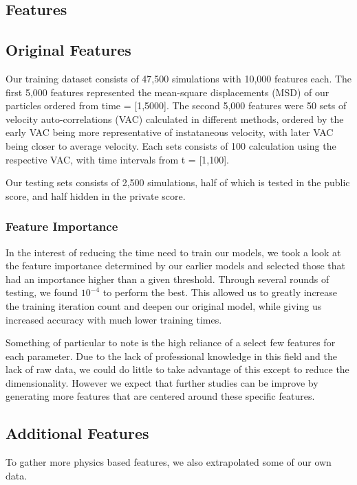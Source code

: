 \documentclass[a4paper, 12pt]{article}
\begin{document}
        \begin{multicols}{2}
        \section{Features}
        \subsection{Original Features}
        Our training dataset consists of 47,500 simulations with 10,000 features each. The first 5,000 features represented the mean-square displacements (MSD) of our particles ordered from time = [1,5000]. The second 5,000 features were 50 sets of velocity auto-correlations (VAC) calculated in different methods, ordered by the early VAC being more representative of instataneous velocity, with later VAC being closer to average velocity. Each sets consists of 100 calculation using the respective VAC, with time intervals from t = [1,100].
        
        Our testing sets consists of 2,500 simulations, half of which is tested in the public score, and half hidden in the private score.

            \subsubsection{Feature Importance}
                In the interest of reducing the time need to train our models, we took a look at the feature importance determined by our earlier models and selected those that had an importance higher than a given threshold. Through several rounds of testing, we found $10^{-4}$ to perform the best. This allowed us to greatly increase the training iteration count and deepen our original model, while giving us increased accuracy with much lower training times.
                
                Something of particular to note is the high reliance of a select few features for each parameter. Due to the lack of professional knowledge in this field and the lack of raw data, we could do little to take advantage of this except to reduce the dimensionality. However we expect that further studies can be improve by generating more features that are centered around these specific features.

            \subsection{Additional Features}
                To gather more physics based features, we also extrapolated some of our own data.


\end{multicols}
\end{document}
